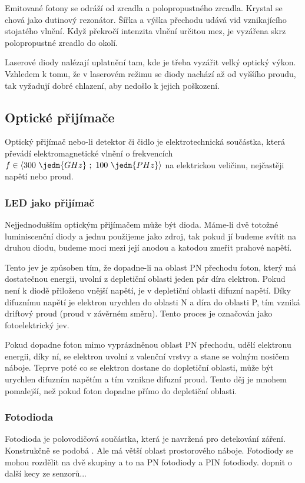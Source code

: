 Emitované fotony se odráží od zrcadla a polopropustného zrcadla.  Krystal se chová jako dutinový rezonátor. Šířka a výška přechodu udává vid vznikajícího stojatého vlnění. Když překročí intenzita vlnění určitou mez, je vyzářena skrz polopropustné zrcadlo do okolí.

Laserové diody nalézají uplatnění tam, kde je třeba vyzářit velký optický výkon. Vzhledem k tomu, že v laserovém režimu se diody nachází až od vyššího proudu, tak vyžadují dobré chlazení, aby nedošlo k jejich poškození.

\subsection{Optické přijímače}
Optický přijímač nebo-li detektor či čidlo je elektrotechnická součástka, která převádí elektromagnetické vlnění o frekvencích $f \in \langle 300~\jedn{GHz}~;~100~\jedn{PHz} \rangle$ na elektrickou veličinu, nejčastěji napětí nebo proud.

\subsubsection{LED jako přijímač}
Nejjednodušším optickým přijímačem může být  dioda. Máme-li dvě totožné luminiscenční diody a jednu použijeme jako zdroj, tak pokud jí budeme svítit na druhou diodu, budeme moci mezi její anodou a katodou zmeřit prahové napětí.

Tento jev je způsoben tím, že dopadne-li na oblast PN přechodu foton, který má dostatečnou energii, uvolní z depletiční oblasti jeden pár díra elektron. Pokud není k diodě přiloženo vnější napětí, je v depletiční oblasti difuzní napětí. Díky difuznímu napětí je elektron urychlen do oblasti N a díra do oblasti P, tím vzniká driftový proud (proud v závěrném směru). Tento proces je označován jako fotoelektrický jev.

Pokud dopadne foton mimo vyprázdněnou oblast PN přechodu, udělí elektronu energii, díky ní, se elektron uvolní z valenční vrstvy a stane se volným nosičem náboje. Teprve poté co se elektron dostane do dopletiční oblasti, může být urychlen difuzním napětím a tím vznikne difuzní proud. Tento děj je mnohem pomalejší, než pokud foton dopadne přímo do depletiční oblasti.

\subsubsection{Fotodioda}
Fotodioda je polovodičová součástka, která je navržená pro detekování záření. Konstrukčně se podobá . Ale má větší oblast prostorového náboje. Fotodiody se mohou rozdělit na dvě skupiny a to na PN fotodiody a PIN fotodiody. dopnit o další kecy ze senzorů...

